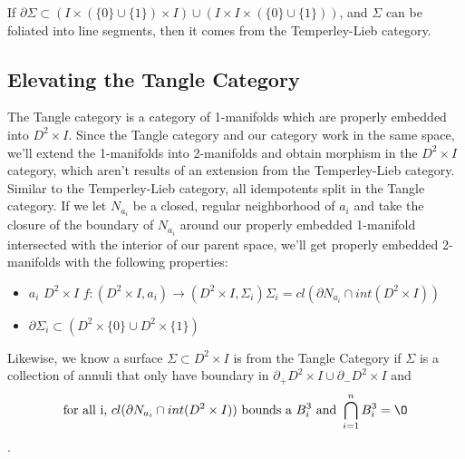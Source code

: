 \documentclass[11pt]{article}
\newcommand{\TL}{Temperley-Lieb }
\newcommand{\parent}{D^2\times I}
\begin{document}
If $\partial\Sigma \subset (I\times (\{ 0 \} \cup \{ 1 \})\times I)\cup (I\times I\times(\{ 0 \}\cup\{ 1 \}))$, and $\Sigma$ can be foliated into line segments, then it comes from the \TL category.





\subsection*{Elevating the Tangle Category}
	The Tangle category is a category of 1-manifolds which are properly embedded into $\parent$. Since the Tangle category and our category work in the same space, we'll extend the 1-manifolds into 2-manifolds and obtain morphism in the $\parent$ category, which aren't results of an extension from the \TL category. Similar to the \TL category, all idempotents split in the Tangle category\cite{BS}. If we let $N_{a_i}$ be a closed, regular neighborhood of $a_i$ and take the closure of the boundary of $N_{a_i}$ around our properly embedded 1-manifold intersected with the interior of our parent space, we'll get properly embedded 2-manifolds with the following properties:
\begin{itemize}
\item {} $a_i$ $\parent$ $f: (\parent, a_i)\rightarrow(\parent,\Sigma_i)$$\Sigma_i = cl(\partial N_{a_i}\cap int(\parent))$
\item {}$\partial\Sigma_i\subset (D^2\times\{ 0 \}\cup D^2 \times\{ 1 \})$
\end{itemize}


Likewise, we know a surface $\Sigma \subset \parent$ is from the Tangle Category if $\Sigma$ is a collection of annuli that only have boundary in $\partial_+\parent\cup\partial_-\parent$ and \[\text{for all i, }cl(\partial N_{a_i}\cap int(\parent))\text{ bounds a } B^3_i\text{ and } \bigcap^n_{i=1}B^3_i = \O\].
\end{document}
